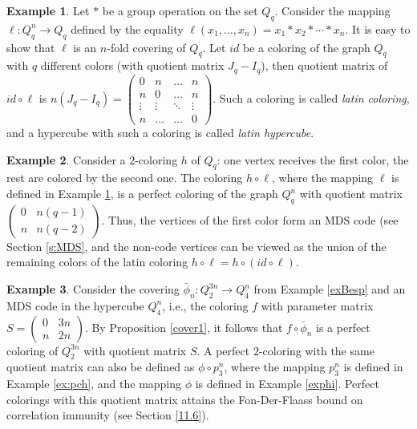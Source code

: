 \documentclass[11pt]{article}
\theoremstyle{definition}
\newtheorem{example}{Example}[section]
\begin{document}
\begin{example}\label{ex:covercube}
Let  $*$  be a group  operation  on the set $Q_q$. Consider the mapping $\ell:Q^n_q\rightarrow Q_q$ defined by the equality $\ell(x_1,\dots,x_n)=x_1* x_2*\cdots* x_n$. It is easy to show that $\ell$
is an $n$-fold covering of  $Q_q$. Let $id$ be a coloring of the graph $Q_q$ with $q$ different colors (with quotient  matrix 
$J_q-I_q$), then quotient matrix  of $id\circ \ell$ is
$n(J_q-I_q)=
\begin{pmatrix}
0 & n & \ldots & n\\
n & 0 & \ldots & n\\
\vdots & \vdots & \ddots & \vdots\\
n & \ldots & \ldots & 0
\end{pmatrix}$. 
Such a coloring is called {\sl latin coloring}, and a hypercube with such a coloring
is called {\sl latin hypercube}. \end{example}

\begin{example}\label{MDSexam}
Consider a $2$-coloring $h$ of $Q_q$: one vertex receives the first color, the rest are colored by the second one. The coloring $h\circ \ell$, where
the mapping $\ell$ is defined in Example \ref{ex:covercube}, is a
perfect coloring of the graph $Q^n_q$ with quotient matrix
$\begin{pmatrix}
0 & n(q-1) \\
n & n(q-2)
\end{pmatrix}$. 
Thus, the vertices of the first color form an
MDS code (see Section \ref{s:MDS}, and the non-code vertices can be viewed as the union
of the remaining colors of the latin coloring $h\circ \ell= h\circ (id \circ
\ell)$.
\end{example}

\begin{example}
Consider the covering $\bar\phi_n :{Q}^{3n}_2
\rightarrow {Q}^n_4$ from Example \ref{exBesp} and an MDS code in the hypercube ${Q}^n_4$, i.e., the coloring $f$
with parameter matrix $S=\begin{pmatrix}
0 & 3n \\
n & 2n
\end{pmatrix}$. By Proposition \ref{cover1}, it follows that $f\circ \bar\phi_n$ is a perfect coloring
 of  ${Q}^{3n}_2$ with quotient matrix $S$.
A perfect $2$-coloring with the same quotient matrix can also be defined as
$\phi\circ p_3^n$, where the mapping $p_3^n$ is defined in Example
\ref{ex:pch}, and the mapping $\phi$ is defined in Example \ref{exphi}.
Perfect colorings with this quotient matrix attains the Fon-Der-Flaass bound
on correlation immunity (see Section \ref{11.6}).
\end{example}
\end{document}
